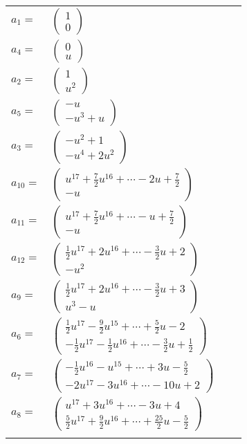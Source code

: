 \documentclass[1p]{elsarticle_modified}
\theoremstyle{definition}
\begin{document}
\begin{tabular}{m{7pt} m{180pt} m{7pt} m{180pt} }
\flushright $a_{1}=$&$\begin{pmatrix}1\\0\end{pmatrix}$ \\
\flushright $a_{4}=$&$\begin{pmatrix}0\\u\end{pmatrix}$ \\
\flushright $a_{2}=$&$\begin{pmatrix}1\\u^2\end{pmatrix}$ \\
\flushright $a_{5}=$&$\begin{pmatrix}- u\\- u^3+u\end{pmatrix}$ \\
\flushright $a_{3}=$&$\begin{pmatrix}- u^2+1\\- u^4+2 u^2\end{pmatrix}$ \\
\flushright $a_{10}=$&$\begin{pmatrix}u^{17}+\frac{7}{2} u^{16}+\cdots-2 u+\frac{7}{2}\\- u\end{pmatrix}$ \\
\flushright $a_{11}=$&$\begin{pmatrix}u^{17}+\frac{7}{2} u^{16}+\cdots- u+\frac{7}{2}\\- u\end{pmatrix}$ \\
\flushright $a_{12}=$&$\begin{pmatrix}\frac{1}{2} u^{17}+2 u^{16}+\cdots-\frac{3}{2} u+2\\- u^2\end{pmatrix}$ \\
\flushright $a_{9}=$&$\begin{pmatrix}\frac{1}{2} u^{17}+2 u^{16}+\cdots-\frac{3}{2} u+3\\u^3- u\end{pmatrix}$ \\
\flushright $a_{6}=$&$\begin{pmatrix}\frac{1}{2} u^{17}-\frac{9}{2} u^{15}+\cdots+\frac{5}{2} u-2\\-\frac{1}{2} u^{17}-\frac{1}{2} u^{16}+\cdots-\frac{3}{2} u+\frac{1}{2}\end{pmatrix}$ \\
\flushright $a_{7}=$&$\begin{pmatrix}-\frac{1}{2} u^{16}- u^{15}+\cdots+3 u-\frac{5}{2}\\-2 u^{17}-3 u^{16}+\cdots-10 u+2\end{pmatrix}$ \\
\flushright $a_{8}=$&$\begin{pmatrix}u^{17}+3 u^{16}+\cdots-3 u+4\\\frac{5}{2} u^{17}+\frac{9}{2} u^{16}+\cdots+\frac{25}{2} u-\frac{5}{2}\end{pmatrix}$\\&\end{tabular}
\end{document}
